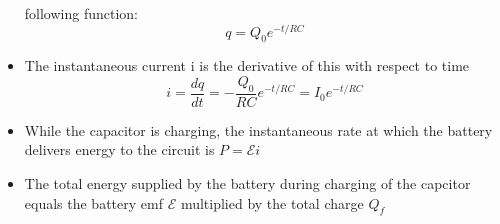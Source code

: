 \documentclass[11pt, a4paper]{article}
\begin{document}
\begin{itemize}
        following function:
        \begin{equation}
            q = Q_0 e^{-t / RC}
        \end{equation}
    \item The instantaneous current i is the derivative of this with respect to time
        \begin{equation}
            i = \frac{dq}{dt} = - \frac{Q_0}{RC} e^{-t / RC} = I_0 e^{-t /RC}
        \end{equation}
    \item While the capacitor is charging, the instantaneous rate at which the battery
        delivers energy to the circuit is $P = \mathcal{E}i$
    \item The total energy supplied by the battery during charging of the capcitor equals
        the battery emf $\mathcal{E}$ multiplied by the total charge $Q_f$
\end{itemize}
\end{document}
